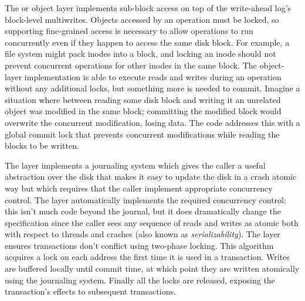 The  or object layer implements sub-block access on top of the write-ahead
log's block-level multiwrites. Objects accessed by an operation must be locked,
so supporting fine-grained access is necessary to allow operations to run
concurrently even if they happen to access the same disk block. For example, a
file system might pack inodes into a block, and locking an inode should not
prevent concurrent operations for other inodes in the same block. The
object-layer implementation is able to execute reads and writes during an
operation without any additional locks, but something more is needed to commit.
Imagine a situation where between reading some disk block and writing it an
unrelated object was modified in the same block; committing the modified block
would overwrite the concurrent modification, losing data. The code addresses
this with a global commit lock that prevents concurrent modifications while
reading the blocks to be written.

The  layer implements a journaling system which gives the caller a
useful abstraction over the disk that makes it easy to update the disk in a
crash atomic way but which requires that the caller implement appropriate
concurrency control. The  layer automatically implements the required
concurrency control; this isn't much code beyond the journal, but it does
dramatically change the specification since the caller sees any sequence of
reads and writes as atomic both with respect to threads and crashes (also known
as \emph{serializability}). The  layer ensures transactions don't
conflict using two-phase locking. This algorithm acquires a lock on each address
the first time it is used in a transaction. Writes are buffered locally until
commit time, at which point they are written atomically using the journaling
system. Finally all the locks are released, exposing the transaction's effects
to subsequent transactions.
